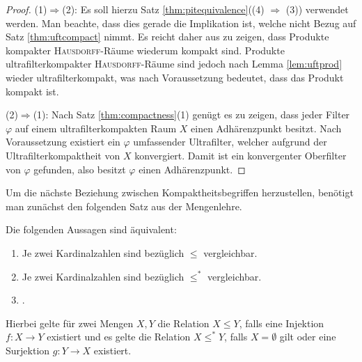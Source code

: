\begin{proof}
  (1)$\Rightarrow$(2):
  Es soll hierzu Satz \ref{thm:pitequivalence}((4) $\Rightarrow$ (3)) verwendet werden.
  Man beachte, dass dies gerade die Implikation ist, welche nicht Bezug auf Satz \ref{thm:uftcompact} nimmt.
  Es reicht daher aus zu zeigen, dass Produkte kompakter \textsc{Hausdorff}-Räume wiederum kompakt sind. 
  Produkte ultrafilterkompakter \textsc{Hausdorff}-Räume sind jedoch nach Lemma \ref{lem:uftprod} wieder ultrafilterkompakt, was nach Voraussetzung bedeutet, dass das Produkt kompakt ist.

  (2)$\Rightarrow$(1):
  Nach Satz \ref{thm:compactness}(1) genügt es zu zeigen, dass jeder Filter $\varphi$ auf einem ultrafilterkompakten Raum $X$ einen Adhärenzpunkt besitzt.
  Nach Voraussetzung existiert ein $\varphi$ umfassender Ultrafilter, welcher aufgrund der Ultrafilterkompaktheit von $X$ konvergiert.
  Damit ist ein konvergenter Oberfilter von $\varphi$ gefunden, also besitzt $\varphi$ einen Adhärenzpunkt.
\end{proof}

Um die nächste Beziehung zwischen Kompaktheitsbegriffen herzustellen, benötigt man zunächst den folgenden Satz aus der Mengenlehre.

\begin{thm}
  \label{thm:comparablecardinal}
  Die folgenden Aussagen sind äquivalent:
  \begin{enumerate}[(1)]
    \item Je zwei Kardinalzahlen sind bezüglich $\leq$ vergleichbar.
    \item Je zwei Kardinalzahlen sind bezüglich $\leq^*$ vergleichbar.
    \item \AC.
  \end{enumerate}
  Hierbei gelte für zwei Mengen $X,Y$ die Relation $X \leq Y$, falls eine Injektion $f \colon X \to Y$ existiert und es gelte die Relation $X \leq^* Y$, falls $X = \emptyset$ gilt oder eine Surjektion $g \colon Y \to X$ existiert.
\end{thm}

